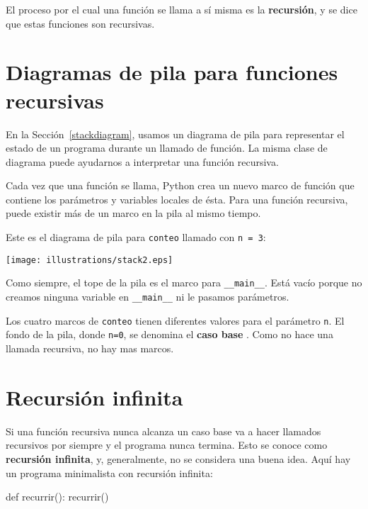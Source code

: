 El proceso por el cual una función se llama a sí misma es la {\bf recursión}, y 
se dice que estas funciones son recursivas.



\section{Diagramas de pila para funciones recursivas}

En la Sección~\ref{stackdiagram}, usamos un diagrama de pila para
representar el estado de un programa durante un llamado de función.
La misma clase de diagrama puede ayudarnos a interpretar una función
recursiva.

Cada vez que una función se llama, Python crea un nuevo marco de función
que contiene los parámetros y variables locales de ésta. Para una
función recursiva, puede existir más de un marco en la pila al mismo
tiempo.

Este es el diagrama de pila para \texttt{conteo} llamado con \texttt{n = 3}:

\beforefig
\centerline{\texttt{[image: illustrations/stack2.eps]}}
\afterfig

Como siempre, el tope de la pila es el marco para \texttt{\_\_main\_\_}.
Está vacío porque no creamos ninguna variable en {\tt \_\_main\_\_} ni le 
pasamos parámetros.

Los cuatro marcos de \texttt{conteo} tienen diferentes valores para
el parámetro \texttt{n}. El fondo de la pila, donde  \texttt{n=0}, se denomina
el {\bf caso base }.  Como no hace una llamada recursiva, no hay mas marcos.


\section{Recursión infinita}

Si una función recursiva nunca alcanza un caso base va a hacer llamados 
recursivos por siempre y el programa nunca termina. Esto se conoce como {\bf 
recursión infinita}, y, generalmente, no se considera una buena idea. Aquí hay 
un programa minimalista con recursión infinita:

\beforeverb
\begin{pythoncode}
def recurrir():
  recurrir()
\end{pythoncode}
\afterverb
%

